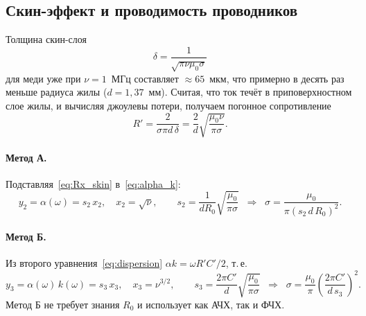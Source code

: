 \documentclass[a4paper,12pt]{article}
\begin{document}
\subsection{Скин-эффект и проводимость проводников}
Толщина скин-слоя
\begin{equation}
    \label{eq:skin}
    \delta = \frac{1}{\sqrt{\pi\nu\mu_0\sigma}}
\end{equation}
для меди уже при $\nu = 1$~МГц составляет $\approx65$~мкм, что примерно в
десять раз меньше радиуса жилы ($d = 1{,}37$~мм). Считая, что ток течёт в
приповерхностном слое жилы, и вычисляя джоулевы потери, получаем
погонное сопротивление
\begin{equation}
    \label{eq:Rx_skin}
    R' = \frac{2}{\sigma\pi d\,\delta}
       = \frac{2}{d}\sqrt{\frac{\mu_0\nu}{\pi\sigma}}.
\end{equation}

\paragraph{Метод А.} Подставляя~\eqref{eq:Rx_skin}
в~\eqref{eq:alpha_k}:
\begin{equation}
    \label{eq:methodA}
    y_2 = \alpha(\omega) = s_2\,x_2,
    \quad x_2 = \sqrt{\nu},
    \qquad
    s_2 = \frac{1}{dR_0}\sqrt{\frac{\mu_0}{\pi\sigma}}
    \;\;\Longrightarrow\;\;
    \sigma = \frac{\mu_0}{\pi\left(s_2\,d\,R_0\right)^2}.
\end{equation}

\paragraph{Метод Б.} Из второго уравнения~\eqref{eq:dispersion}
$\alpha k = \omega R'C'/2$, т.\,е.
\begin{equation}
    \label{eq:methodB}
    y_3 = \alpha(\omega)\,k(\omega) = s_3\,x_3,
    \quad x_3 = \nu^{3/2},
    \qquad
    s_3 = \frac{2\pi C'}{d}\sqrt{\frac{\mu_0}{\pi\sigma}}
    \;\;\Longrightarrow\;\;
    \sigma = \frac{\mu_0}{\pi}\left(\frac{2\pi C'}{d\,s_3}\right)^2.
\end{equation}
Метод Б не требует знания $R_0$ и использует как АЧХ, так и ФЧХ.
\end{document}
